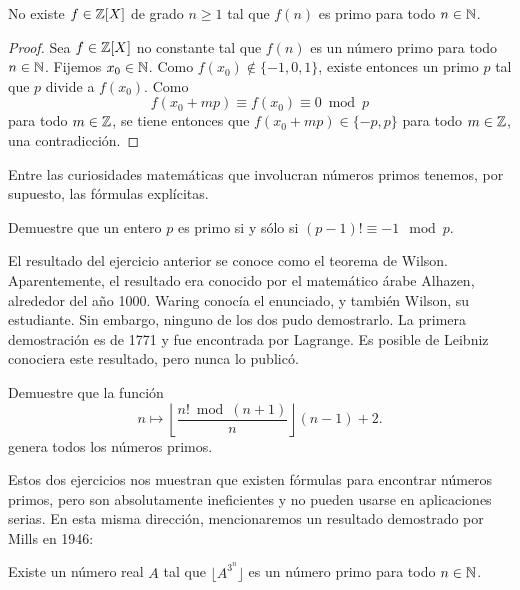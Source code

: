 \begin{theorem}[Goldbach]
	No existe $f\in\mathbb{Z}[X]$ de grado $n\geq1$ tal que $f(n)$ es primo para todo
	$n\in\mathbb{N}$.
\end{theorem}

\begin{proof}
	Sea $f\in\mathbb{Z}[X]$ no constante tal que $f(n)$ es un número primo para todo
	$n\in\mathbb{N}$. Fijemos $x_0\in\mathbb{N}$. Como $f(x_0)\not\in\{-1,0,1\}$, existe
	entonces un primo $p$ tal que $p$ divide a $f(x_0)$. Como
	\[
		f(x_0+mp)\equiv f(x_0)\equiv 0\bmod p
	\]
	para todo $m\in\mathbb{Z}$, se tiene entonces que $f(x_0+mp)\in\{-p,p\}$ para todo
	$m\in\mathbb{Z}$, una contradicción.
\end{proof}

Entre las curiosidades matemáticas que involucran números primos tenemos, por
supuesto, las fórmulas explícitas. 

\begin{exercise}
	Demuestre que un entero $p$ es primo si y sólo si
	$(p-1)!\equiv -1\mod p$. 
\end{exercise}

El resultado del ejercicio anterior se conoce como el teorema de Wilson.
Aparentemente, el resultado era conocido por el matemático árabe Alhazen,
alrededor del año 1000. Waring conocía el enunciado, y también Wilson, su
estudiante. Sin embargo, ninguno de los dos pudo demostrarlo. La primera
demostración es de 1771 y fue encontrada por Lagrange. Es posible de Leibniz
conociera este resultado, pero nunca lo publicó.



\begin{exercise}
	Demuestre que la función 
	\[
		n\mapsto \left\lfloor\frac{n!\bmod (n+1)}{n}\right\rfloor (n-1)+2.
	\]
	genera todos los números primos. 
\end{exercise}

Estos dos ejercicios nos muestran que existen fórmulas para encontrar números
primos, pero son absolutamente ineficientes y no pueden usarse en aplicaciones
serias. En esta misma dirección, mencionaremos un resultado demostrado por
Mills en 1946:

\begin{theorem}[Mills]
	Existe un número real $A$ tal que $\lfloor A^{3^n}\rfloor$ es un número
	primo para todo $n\in\mathbb{N}$.	
\end{theorem}

